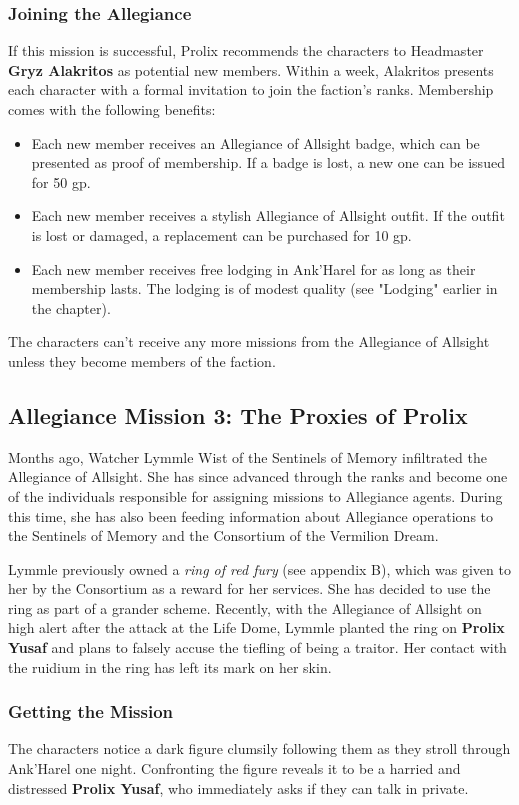 \documentclass[10pt,a4paper,twoside,fancy,bg=print,twocolumn,openany,nodeprecatedcode]{dndbook}
\begin{document}
\subsubsection{Joining the Allegiance}
If this mission is successful, Prolix recommends the characters to Headmaster \textbf{Gryz Alakritos} as potential new members. Within a week, Alakritos presents each character with a formal invitation to join the faction's ranks. Membership comes with the following benefits:


\begin{itemize}
\item Each new member receives an Allegiance of Allsight badge, which can be presented as proof of membership. If a badge is lost, a new one can be issued for 50 gp.
\item Each new member receives a stylish Allegiance of Allsight outfit. If the outfit is lost or damaged, a replacement can be purchased for 10 gp.
\item Each new member receives free lodging in Ank'Harel for as long as their membership lasts. The lodging is of modest quality (see "Lodging" earlier in the chapter).
\end{itemize}

The characters can't receive any more missions from the Allegiance of Allsight unless they become members of the faction.

\subsection{Allegiance Mission 3: The Proxies of Prolix}
Months ago, Watcher Lymmle Wist of the Sentinels of Memory infiltrated the Allegiance of Allsight. She has since advanced through the ranks and become one of the individuals responsible for assigning missions to Allegiance agents. During this time, she has also been feeding information about Allegiance operations to the Sentinels of Memory and the Consortium of the Vermilion Dream.

Lymmle previously owned a \textit{ring of red fury} (see appendix B), which was given to her by the Consortium as a reward for her services. She has decided to use the ring as part of a grander scheme. Recently, with the Allegiance of Allsight on high alert after the attack at the Life Dome, Lymmle planted the ring on \textbf{Prolix Yusaf} and plans to falsely accuse the tiefling of being a traitor. Her contact with the ruidium in the ring has left its mark on her skin.

\subsubsection{Getting the Mission}
The characters notice a dark figure clumsily following them as they stroll through Ank'Harel one night. Confronting the figure reveals it to be a harried and distressed \textbf{Prolix Yusaf}, who immediately asks if they can talk in private.
\end{document}
